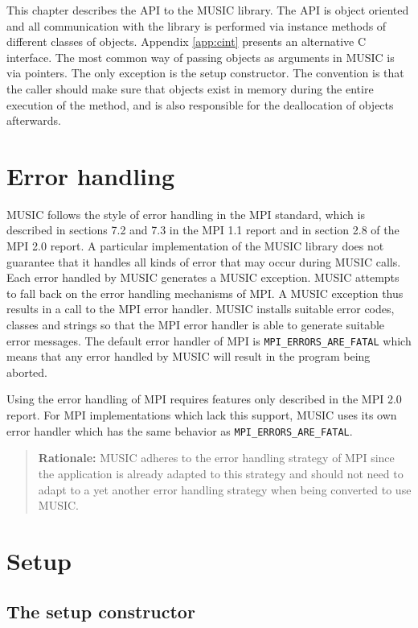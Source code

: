 \documentclass[a4paper]{report}
\newenvironment{rationale}%
{\par\begin{quote}\textbf{Rationale:}}%
{\par\end{quote}}
\begin{document}
This chapter describes the API to the MUSIC library.  The API is
object oriented and all communication with the library is performed
via instance methods of different classes of objects.  Appendix
\ref{app:cint} presents an alternative C interface.  The most common
way of passing objects as arguments in MUSIC is via pointers.  The
only exception is the setup constructor.  The convention is that the
caller should make sure that objects exist in memory during the entire
execution of the method, and is also responsible for the deallocation
of objects afterwards.

\section{Error handling}

MUSIC follows the style of error handling in the MPI standard, which
is described in sections 7.2 and 7.3 in the MPI 1.1
report\cite{mpi1.1} and in section 2.8 of the MPI 2.0
report\cite{mpi2.0}.  A particular implementation of the MUSIC library
does not guarantee that it handles all kinds of error that may occur
during MUSIC calls.  Each error handled by MUSIC generates a MUSIC
exception.  MUSIC attempts to fall back on the error handling
mechanisms of MPI.  A MUSIC exception thus results in a call to the
MPI error handler.  MUSIC installs suitable error codes, classes and
strings so that the MPI error handler is able to generate suitable
error messages.  The default error handler of MPI is
\lstinline|MPI_ERRORS_ARE_FATAL| which means that any error handled by
MUSIC will result in the program being aborted.

Using the error handling of MPI requires features only described in
the MPI 2.0 report.  For MPI implementations which lack this support,
MUSIC uses its own error handler which has the same behavior as
\lstinline|MPI_ERRORS_ARE_FATAL|.

\begin{rationale}
  MUSIC adheres to the error handling strategy of MPI since the
  application is already adapted to this strategy and should not need
  to adapt to a yet another error handling strategy when being
  converted to use MUSIC.
\end{rationale}

\section{Setup}

\subsection{The setup constructor}
\end{document}
